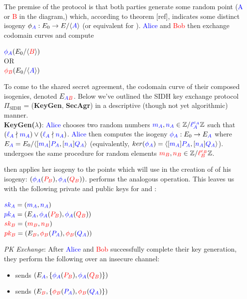 The premise of the protocol is that both parties generate some random point (\textcolor{blue}{A} or \textcolor{red}{B} in the diagram,) which, according to theorem [ref], indicates some distinct isogeny $\phi_{\ba}: E_0 \rightarrow E/ \langle \ba \rangle$ (or equivalent for \rb). \textcolor{blue}{Alice} and \textcolor{red}{Bob} then exchange codomain curves and compute
\begin{center}
$\pa(E_0/\langle \rb \rangle)$\\
$\text{OR}$\\
$\pb(E_0/\langle \ba \rangle)$
\end{center}
To come to the shared secret agreement, the codomain curve of their composed isogenies, denoted $E_{\ba\rb}$. Below we've outlined the SIDH key exchange protocol $\Pi_{\text{SIDH}}$ = (\textbf{KeyGen}, \textbf{SecAgr}) in a descriptive (though not yet algorithmic) manner.\\

\noindent
\textbf{KeyGen($\lambda$)}: \textcolor{blue}{Alice} chooses two random numbers $\ma, \na \in \mathbb{Z}/\laea\mathbb{Z}$ such that $(\la \nmid \ma) \lor (\la \nmid \na)$. \textcolor{blue}{Alice} then computes the isogeny $\pa: E_0 \rightarrow E_{\ba}$ where $E_{\ba} = E_0 / \langle [\ma]\genpa, [\na]\genqa\rangle$ (equivalently, $ker(\pa) = \langle [\ma]\genpa, [\na]\genqa\rangle$). \bob undergoes the same procedure for random elements $\mb, \nb \in \mathbb{Z}/\lbeb\mathbb{Z}$.

\alice then applies her isogeny to the points which \bob will use in the creation of of his isogeny: $(\pa(\genpb),\pa(\genqb))$. \bob performs the analogous operation. This leaves us with the following private and public keys for \alice and \bob:

\begin{center}
$\ska = (\ma,\na)$\\
$\pka = (E_{\ba}, \pa(\genpb),\pa(\genqb))$\\
$\skb = (\mb,\nb)$\\
$\pkb = (E_{\rb}, \pb(\genpa),\pb(\genqa))$\\
\end{center}

\noindent
\textit{PK Exchange}: After \textcolor{blue}{Alice} and \textcolor{red}{Bob} successfully complete their key generation, they perform the following over an insecure channel:
\begin{itemize}
\item \alice sends \bob $(E_{\ba}, \{\pa(\genpb),\pa(\genqb)\})$
\item \bob sends \alice $(E_{\rb}, \{\pb(\genpa),\pb(\genqa)\})$
\end{itemize}

